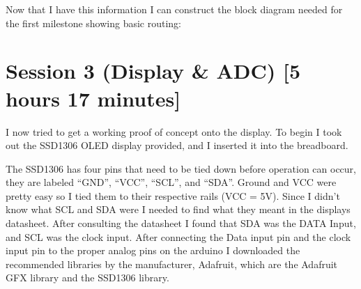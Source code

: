 \documentclass{article}
\begin{document}
Now that I have this information I can construct the block diagram needed for the first milestone showing basic routing:
\begin{center}
\end{center}
\newpage
\section{Session 3 (Display \& ADC) [5 hours 17 minutes]}
I now tried to get a working proof of concept onto the display. To begin I took out the SSD1306 OLED display provided, and I inserted it into the breadboard.
\begin{center}
\end{center}
The SSD1306 has four pins that need to be tied down before operation can occur, they are labeled “GND”, “VCC”, “SCL”, and “SDA”. Ground and VCC were pretty easy so I tied them to their respective rails (VCC = 5V). Since I didn't know what SCL and SDA were I needed to find what they meant in the displays datasheet. After consulting the datasheet I found that SDA was the DATA Input, and SCL was the clock input. After connecting the Data input pin and the clock input pin to the proper analog pins on the arduino I downloaded the recommended libraries by the manufacturer, Adafruit, which are the Adafruit GFX library and the SSD1306 library. 
\end{document}
